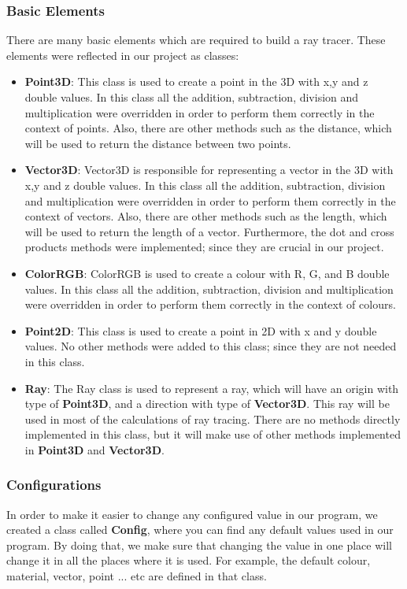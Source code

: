 \documentclass[a4paper]{report}
\begin{document}
	\subsubsection{Basic Elements}
	There are many basic elements which are required to build a ray tracer. These elements were reflected in our project as classes: 
	\begin{itemize}
		\item \textbf{Point3D}: This class is used to create a point in the 3D with x,y and z double values. In this class all the addition, subtraction, division and multiplication were overridden in order to perform them correctly in the context of points. Also, there are other methods such as the distance, which will be used to return the distance between two points.
		\item \textbf{Vector3D}: Vector3D is responsible for representing a vector in the 3D with x,y and z double values. In this class all the addition, subtraction, division and multiplication were overridden in order to perform them correctly in the context of vectors. Also, there are other methods such as the length, which will be used to return the length of a vector. Furthermore, the dot and cross products methods were implemented; since they are crucial in our project.
		\item \textbf{ColorRGB}: ColorRGB is used to create a colour with R, G, and B double values. In this class all the addition, subtraction, division and multiplication were overridden in order to perform them correctly in the context of colours.
		\item \textbf{Point2D}: This class is used to create a point in 2D with x and y double values. No other methods were added to this class; since they are not needed in this class.
		\item \textbf{Ray}: The Ray class is used to represent a ray, which will have an origin with type of \textbf{Point3D}, and a direction with type of \textbf{Vector3D}. This ray will be used in most of the calculations of ray tracing. There are no methods directly implemented in this class, but it will make use of other methods implemented in \textbf{Point3D} and \textbf{Vector3D}.
	\end{itemize}
	\subsubsection{Configurations}
	In order to make it easier to change any configured value in our program, we created a class called \textbf{Config}, where you can find any default values used in our program. By doing that, we make sure that changing the value in one place will change it in all the places where it is used. For example, the default colour, material, vector, point ... etc are defined in that class. 
\end{document}
